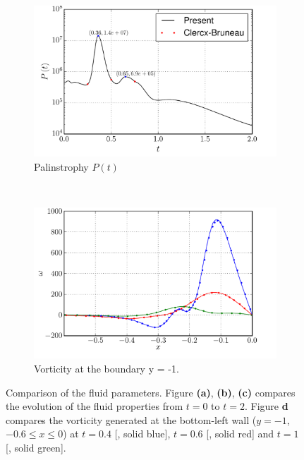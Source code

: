 \begin{figure}[p]
     \begin{subfigure}[b]{0.49\textwidth}
             \includegraphics[width=\textwidth]{figures/eulerian/dipole_Palinstrophy_comparison.pdf}
             \caption{Palinstrophy $P(t)$}
             \label{fig:dipole_Palinstrophy_comparison}
     \end{subfigure}
     ~
     \begin{subfigure}[b]{0.48\textwidth}
		\includegraphics[width=\textwidth]{./figures/eulerian/VorticityAtBoundary.pdf}
		\caption{Vorticity at the boundary y = -1.}
		\label{fig:VorticityAtBoundary}
     \end{subfigure}     
     
     \caption{Comparison of the fluid parameters. Figure \textbf{(a)}, \textbf{(b)}, \textbf{(c)} compares the evolution of the fluid properties from $t=0$ to $t=2$. Figure \textbf{d} compares the vorticity generated at the bottom-left wall ($y=-1$, $-0.6\leqslant x \leqslant 0$) at $t=0.4$ [{\color{plotBlue}{---}}, solid blue], $t=0.6$ [{\color{plotRed}{---}}, solid red] and $t=1$ [{\color{plotGreen}{---}}, solid green].}
     \label{fig:dipole_comparison}
	\end{figure}


